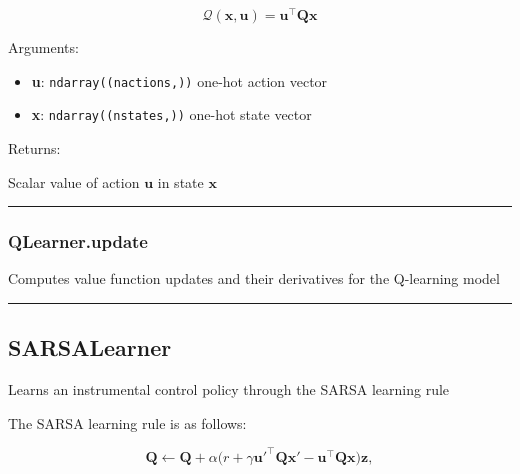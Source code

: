 \[
\mathcal Q(\mathbf x, \mathbf u) = \mathbf u^\top \mathbf Q \mathbf x
\]

Arguments:

\begin{itemize}
\tightlist
\item
  \textbf{u}: \texttt{ndarray((nactions,))} one-hot action vector
\item
  \textbf{x}: \texttt{ndarray((nstates,))} one-hot state vector
\end{itemize}

Returns:

Scalar value of action \(\mathbf u\) in state \(\mathbf x\)

\begin{center}\rule{0.5\linewidth}{\linethickness}\end{center}

\subsubsection{QLearner.update}\label{qlearner.update}

\begin{Shaded}
\begin{Highlighting}[]
\end{Highlighting}
\end{Shaded}

Computes value function updates and their derivatives for the Q-learning
model

\begin{center}\rule{0.5\linewidth}{\linethickness}\end{center}

\subsection{SARSALearner}\label{sarsalearner}

\begin{Shaded}
\begin{Highlighting}[]
\end{Highlighting}
\end{Shaded}

Learns an instrumental control policy through the SARSA learning rule

The SARSA learning rule is as follows:

\[
\mathbf Q \gets \mathbf Q + \alpha \big(r + \gamma \mathbf u'^\top \mathbf Q \mathbf x' - \mathbf u^\top \mathbf Q \mathbf x \big) \mathbf z,
\]

